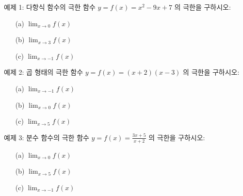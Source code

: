 \documentclass[aspectratio=169]{beamer}
\begin{document}
\begin{frame}{예제 1: 다항식 함수의 극한}
  함수 \( y = f(x) = x^2 - 9x + 7 \) 의 극한을 구하시오:
  \begin{itemize}
    \item[(a)] \( \lim_{x \to 0} f(x)  \)
    \vspace{0.3cm}
    \item[(b)] \( \lim_{x \to 3} f(x)  \)
    \vspace{0.3cm}
    \item[(c)] \( \lim_{x \to -1} f(x)  \)
  \end{itemize}
\end{frame}

\begin{frame}{예제 2: 곱 형태의 극한}
함수 \( y = f(x) = (x + 2)(x - 3) \) 의 극한을 구하시오:
\begin{itemize}
  \item[(a)] \( \lim_{x \to -1} f(x)  \)
  \vspace{0.3cm}
  \item[(b)] \( \lim_{x \to 0} f(x)  \)
  \vspace{0.3cm}
  \item[(c)] \( \lim_{x \to 5} f(x)  \)
\end{itemize}
\end{frame}

\begin{frame}{예제 3: 분수 함수의 극한}
함수 \( y = f(x) = \frac{3x + 5}{x + 2} \) 의 극한을 구하시오:
\begin{itemize}
  \item[(a)] \( \lim_{x \to 0} f(x)  \)
  \vspace{0.3cm}
  \item[(b)] \( \lim_{x \to 5} f(x)  \)
  \vspace{0.3cm}
  \item[(c)] \( \lim_{x \to -1} f(x)  \)
\end{itemize}
\end{frame}
\end{document}
